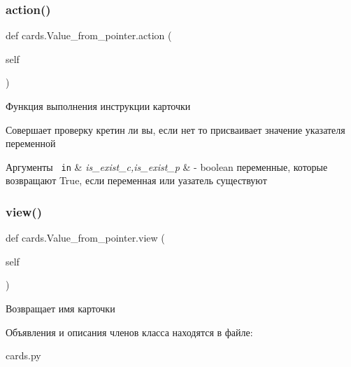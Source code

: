 \subsubsection{\texorpdfstring{action()}{action()}}
{\footnotesize\ttfamily def cards.\+Value\+\_\+from\+\_\+pointer.\+action (\begin{DoxyParamCaption}\item[{}]{self }\end{DoxyParamCaption})}



Функция выполнения инструкции карточки 

Совершает проверку кретин ли вы, если нет то присваивает значение указателя переменной 
\begin{DoxyParams}[1]{Аргументы}
\mbox{\texttt{ in}}  & {\em is\+\_\+exist\+\_\+c,is\+\_\+exist\+\_\+p} & -\/ boolean переменные, которые возвращают True, если переменная или уазатель существуют \\
\hline
\end{DoxyParams}
\mbox{\label{classcards_1_1_value__from__pointer_ab20c085652300a7b52408ed88c61acbc}} 
\subsubsection{\texorpdfstring{view()}{view()}}
{\footnotesize\ttfamily def cards.\+Value\+\_\+from\+\_\+pointer.\+view (\begin{DoxyParamCaption}\item[{}]{self }\end{DoxyParamCaption})}



Возвращает имя карточки 



Объявления и описания членов класса находятся в файле\+:\begin{DoxyCompactItemize}
\item 
cards.\+py\end{DoxyCompactItemize}
